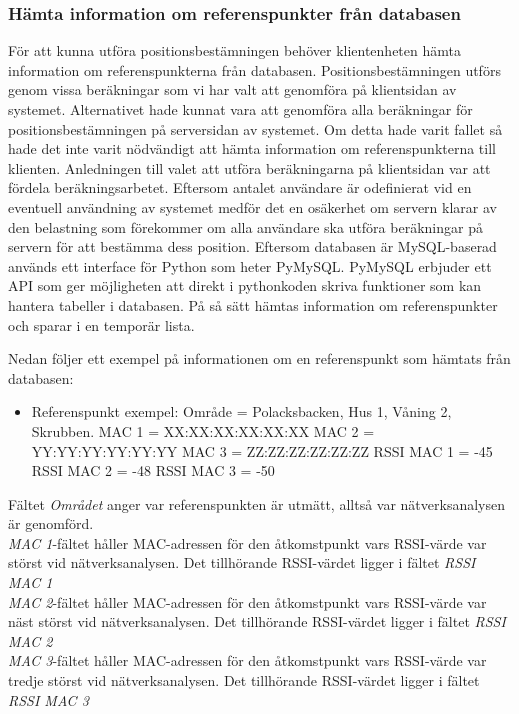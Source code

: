 \documentclass[a4paper,12pt]{article}
\begin{document}
 \subsubsection{Hämta information om referenspunkter från databasen}\label{HamtaInfoDB}
 För att kunna utföra positionsbestämningen behöver klientenheten hämta information om referenspunkterna från databasen. Positionsbestämningen utförs genom vissa beräkningar som vi har valt att genomföra på klientsidan av systemet. Alternativet hade kunnat vara att genomföra alla beräkningar för positionsbestämningen på serversidan av systemet. Om detta hade varit fallet så hade det inte varit nödvändigt att hämta information om referenspunkterna till klienten. Anledningen till valet att utföra beräkningarna på klientsidan var att fördela beräkningsarbetet. Eftersom antalet användare är odefinierat vid en eventuell användning av systemet medför det en osäkerhet om servern klarar av den belastning som förekommer om alla användare ska utföra beräkningar på servern för att bestämma dess position. Eftersom databasen är MySQL-baserad används ett interface för Python som heter PyMySQL\cite{mysqldb}. PyMySQL erbjuder ett API som ger möjligheten att direkt i pythonkoden skriva funktioner som kan hantera tabeller i databasen. På så sätt hämtas information om referenspunkter och sparar i en temporär lista.

 Nedan följer ett exempel på informationen om en referenspunkt som hämtats från databasen:
 \begin{itemize}
   \item Referenspunkt exempel:
         \newline Område = Polacksbacken, Hus 1, Våning 2, Skrubben.
         \newline MAC 1 = XX:XX:XX:XX:XX:XX
         \newline MAC 2 = YY:YY:YY:YY:YY:YY
         \newline MAC 3 = ZZ:ZZ:ZZ:ZZ:ZZ:ZZ
         \newline RSSI MAC 1 = -45
         \newline RSSI MAC 2 = -48
         \newline RSSI MAC 3 = -50
 \end{itemize}


 Fältet \textit{Området} anger var referenspunkten är utmätt, alltså var nätverksanalysen är genomförd. \\
 \textit{MAC 1}-fältet håller MAC-adressen för den åtkomstpunkt vars RSSI-värde var störst vid nätverksanalysen. Det tillhörande RSSI-värdet ligger i fältet \textit{RSSI MAC 1}\\
  \textit{MAC 2}-fältet håller MAC-adressen för den åtkomstpunkt vars RSSI-värde var näst störst vid nätverksanalysen. Det tillhörande RSSI-värdet ligger i fältet \textit{RSSI MAC 2}\\
   \textit{MAC 3}-fältet håller MAC-adressen för den åtkomstpunkt vars RSSI-värde var tredje störst vid nätverksanalysen. Det tillhörande RSSI-värdet ligger i fältet \textit{RSSI MAC 3}\\
\end{document}
